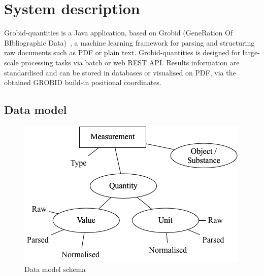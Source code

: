 \documentclass[sigconf]{acmart}
\begin{document}
\section{System description}
\label{sec:system}
Grobid-quantities is a Java application, based on Grobid (GeneRation Of BIbliographic Data)~\cite{GROBID}, a machine learning framework for parsing and structuring raw documents such as PDF or plain text. Grobid-quantities is designed for large-scale processing tasks via batch or web REST API. Results information are standardised and can be stored in databases or visualised on PDF, via the obtained GROBID build-in positional coordinates.

\subsection{Data model}
\label{subsub:data-model}
\begin{figure}[ht]
  \centering
  \includegraphics[width=\linewidth]{images/schema-2}
  \caption{Data model schema}
  \label{fig:data-model-schema-2}
\end{figure}
\end{document}
